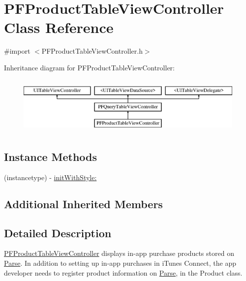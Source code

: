 \hypertarget{interface_p_f_product_table_view_controller}{}\section{P\+F\+Product\+Table\+View\+Controller Class Reference}
\label{interface_p_f_product_table_view_controller}


{\ttfamily \#import $<$P\+F\+Product\+Table\+View\+Controller.\+h$>$}

Inheritance diagram for P\+F\+Product\+Table\+View\+Controller\+:\begin{figure}[H]
\begin{center}
\leavevmode
\includegraphics[height=2.871795cm]{interface_p_f_product_table_view_controller}
\end{center}
\end{figure}
\subsection*{Instance Methods}
\begin{DoxyCompactItemize}
\item 
(instancetype) -\/ \hyperlink{interface_p_f_product_table_view_controller_a654dc66b0660fab1cb10458e06920836}{init\+With\+Style\+:}
\end{DoxyCompactItemize}
\subsection*{Additional Inherited Members}


\subsection{Detailed Description}
{\ttfamily \hyperlink{interface_p_f_product_table_view_controller}{P\+F\+Product\+Table\+View\+Controller}} displays in-\/app purchase products stored on \hyperlink{interface_parse}{Parse}. In addition to setting up in-\/app purchases in i\+Tunes Connect, the app developer needs to register product information on \hyperlink{interface_parse}{Parse}, in the Product class. 

